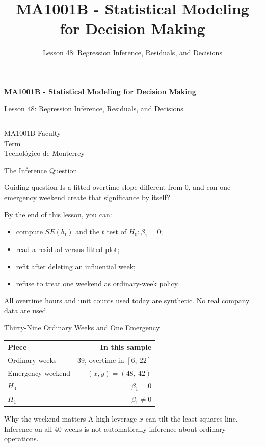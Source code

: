 \documentclass[aspectratio=169,10pt,english]{beamer}
\title{MA1001B - Statistical Modeling for Decision Making}
\subtitle{Lesson 48: Regression Inference, Residuals, and Decisions}
\author{}
\institute{Tecnol\'ogico de Monterrey}
\date{}
\begin{document}
\begin{frame}[plain]
  \vspace{1.2cm}
  {\Large\bfseries MA1001B - Statistical Modeling for Decision Making\par}
  \vspace{0.7cm}
  {\large Lesson 48: Regression Inference, Residuals, and Decisions\par}
  \vspace{0.7cm}
  {\color{TecRojo}\rule{\textwidth}{1.2pt}}
  \vspace{0.8cm}

  MA1001B Faculty\\[0.3cm]
  Term\\[0.3cm]
  Tecnol\'ogico de Monterrey
\end{frame}

\begin{frame}{The Inference Question}
  \begin{alertblock}{Guiding question}
    Is a fitted overtime slope different from 0, and can one emergency
    weekend create that significance by itself?
  \end{alertblock}

  \vspace{0.6em}
  By the end of this lesson, you can:
  \begin{itemize}
    \item compute $SE(b_1)$ and the $t$ test of $H_0:\beta_1=0$;
    \item read a residual-versus-fitted plot;
    \item refit after deleting an influential week;
    \item refuse to treat one weekend as ordinary-week policy.
  \end{itemize}

  \vfill
  \scriptsize All overtime hours and unit counts used today are synthetic. No real company data are used.
\end{frame}

\begin{frame}{Thirty-Nine Ordinary Weeks and One Emergency}
  \small
  \begin{center}
    \begin{tabular}{lr}
      \toprule
      \textbf{Piece} & \textbf{In this sample} \\
      \midrule
      Ordinary weeks & 39, overtime in $[6,\ 22]$ \\
      Emergency weekend & $(x,y)=(48,\ 42)$ \\
      $H_0$ & $\beta_1=0$ \\
      $H_1$ & $\beta_1\neq 0$ \\
      \bottomrule
    \end{tabular}
  \end{center}

  \vspace{0.5em}
  \begin{exampleblock}{Why the weekend matters}
    A high-leverage $x$ can tilt the least-squares line. Inference on all 40
    weeks is not automatically inference about ordinary operations.
  \end{exampleblock}
\end{frame}
\end{document}
